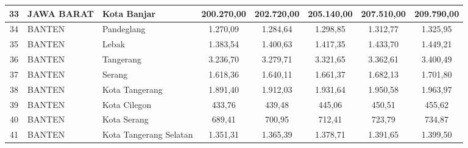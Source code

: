\begin{spacing}{1.0}
\begin{longtable}{|c|p{2.2cm}|p{2.8cm}|c|c|c|c|c|}
33 & JAWA BARAT & Kota Banjar & 200.270,00 & 202.720,00 & 205.140,00 & 207.510,00 & 209.790,00 \\ \hline
34 & BANTEN & Pandeglang & 1.270,09 & 1.284,64 & 1.298,85 & 1.312,77 & 1.325,95 \\ \hline
35 & BANTEN & Lebak & 1.383,54 & 1.400,63 & 1.417,35 & 1.433,70 & 1.449,21 \\ \hline
36 & BANTEN & Tangerang & 3.236,70 & 3.279,71 & 3.321,65 & 3.362,61 & 3.400,49 \\ \hline
37 & BANTEN & Serang & 1.618,36 & 1.640,11 & 1.661,37 & 1.682,13 & 1.701,80 \\ \hline
38 & BANTEN & Kota Tangerang & 1.891,40 & 1.912,03 & 1.931,64 & 1.950,58 & 1.963,97 \\ \hline
39 & BANTEN & Kota Cilegon & 433,76 & 439,48 & 445,06 & 450,51 & 455,62 \\ \hline
40 & BANTEN & Kota Serang & 689,41 & 700,95 & 712,41 & 723,79 & 734,87 \\ \hline
41 & BANTEN & Kota Tangerang Selatan & 1.351,31 & 1.365,39 & 1.378,71 & 1.391,65 & 1.399,50 \\ \hline
\end{longtable}
\end{spacing}